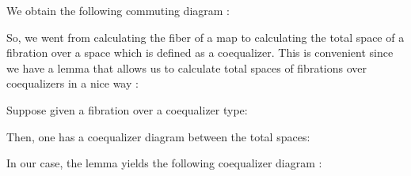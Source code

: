 \documentclass{report}
\begin{document}
\begin{center}
\end{center}
We obtain the following commuting diagram : 
\begin{center}
\end{center}
So, we went from calculating the fiber of a map to calculating the total space of a fibration over a space which is defined as a coequalizer. This is convenient since we have a lemma that allows us to calculate total spaces of fibrations over coequalizers in a nice way : 
\begin{prop}
  Suppose given a fibration over a coequalizer type: 
  \begin{center}
  \end{center}
  Then, one has a coequalizer diagram between the total spaces: 
  \begin{center}
  \end{center}
\end{prop}
In our case, the lemma yields the following coequalizer diagram :
\begin{center}
\end{center}
\end{document}
